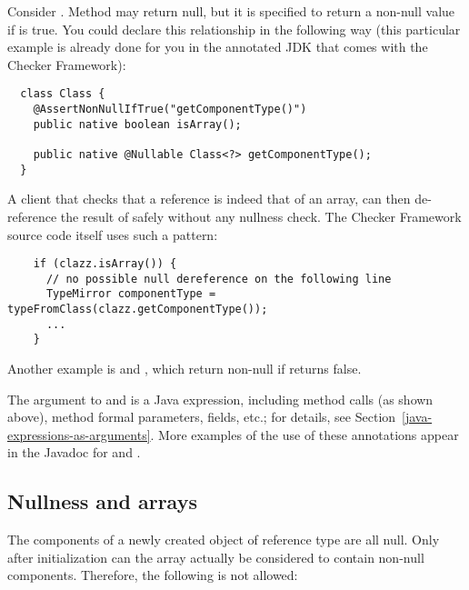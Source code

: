 Consider .
Method
may return null, but it is specified to return a non-null value if
 is
true.
You could declare this relationship in the following way (this particular
example is already
done for you in the annotated JDK that comes with the Checker Framework):

\begin{Verbatim}
  class Class {
    @AssertNonNullIfTrue("getComponentType()")
    public native boolean isArray();

    public native @Nullable Class<?> getComponentType();
  }
\end{Verbatim}

A client that checks that a  reference is indeed that of an array,
can then de-reference the result of  safely
without any nullness check.  The Checker Framework source code itself
uses such a pattern:

\begin{Verbatim}
    if (clazz.isArray()) {
      // no possible null dereference on the following line
      TypeMirror componentType = typeFromClass(clazz.getComponentType());
      ...
    }
\end{Verbatim}

Another example is 
and , which return
non-null if 
returns false.

The argument to  and
 is a Java expression, including method calls
(as shown above), method formal parameters, fields, etc.; for details, see
Section~\ref{java-expressions-as-arguments}.
More examples of the use of these annotations appear in the Javadoc for
 and
.


\subsection{Nullness and arrays\label{nullness-arrays}}

The components of a newly created object of reference type are all
null. Only after initialization can the array actually be considered
to contain non-null components.
Therefore, the following is not allowed:

